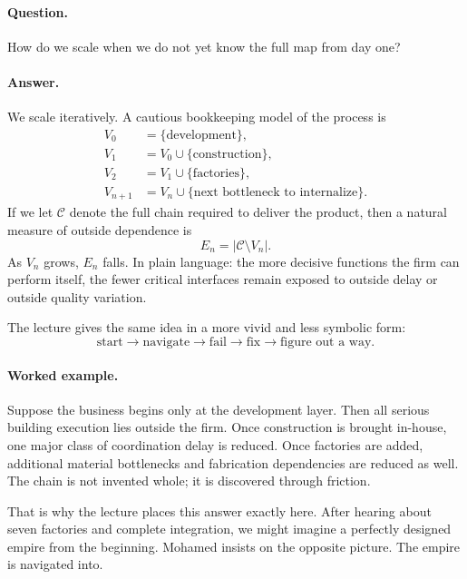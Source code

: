 \paragraph{Question.} How do we scale when we do not yet know the full map from day one?

\paragraph{Answer.} We scale iteratively. A cautious bookkeeping model of the process is
\begin{align}
V_0 &= \{\text{development}\},\\
V_1 &= V_0 \cup \{\text{construction}\},\\
V_2 &= V_1 \cup \{\text{factories}\},\\
V_{n+1} &= V_n \cup \{\text{next bottleneck to internalize}\}.
\end{align}
If we let \(\mathcal{C}\) denote the full chain required to deliver the product, then a natural measure of outside dependence is
\begin{equation}
E_n = \lvert \mathcal{C} \setminus V_n \rvert.
\end{equation}
As \(V_n\) grows, \(E_n\) falls. In plain language: the more decisive functions the firm can perform itself, the fewer critical interfaces remain exposed to outside delay or outside quality variation.

The lecture gives the same idea in a more vivid and less symbolic form:
\begin{equation}
\text{start} \to \text{navigate} \to \text{fail} \to \text{fix} \to \text{figure out a way}.
\end{equation}

\paragraph{Worked example.} Suppose the business begins only at the development layer. Then all serious building execution lies outside the firm. Once construction is brought in-house, one major class of coordination delay is reduced. Once factories are added, additional material bottlenecks and fabrication dependencies are reduced as well. The chain is not invented whole; it is discovered through friction.

That is why the lecture places this answer exactly here. After hearing about seven factories and complete integration, we might imagine a perfectly designed empire from the beginning. Mohamed insists on the opposite picture. The empire is navigated into.

